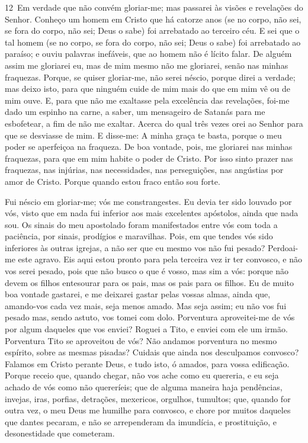 \medskip

\lettrine{12}\ Em verdade que não convém gloriar-me; mas
passarei às visões e revelações do Senhor. Conheço um homem em
Cristo que há catorze anos (se no corpo, não sei, se fora do corpo,
não sei; Deus o sabe) foi arrebatado ao terceiro céu. E sei que
o tal homem (se no corpo, se fora do corpo, não sei; Deus o sabe)
foi arrebatado ao paraíso; e ouviu palavras inefáveis, que ao
homem não é lícito falar. De alguém assim me gloriarei eu, mas
de mim mesmo não me gloriarei, senão nas minhas fraquezas.
Porque, se quiser gloriar-me, não serei néscio, porque direi a
verdade; mas deixo isto, para que ninguém cuide de mim mais do que
em mim vê ou de mim ouve. E, para que não me exaltasse pela
excelência das revelações, foi-me dado um espinho na carne, a saber,
um mensageiro de Satanás para me esbofetear, a fim de não me
exaltar. Acerca do qual três vezes orei ao Senhor para que se
desviasse de mim. E disse-me: A minha graça te basta, porque o
meu poder se aperfeiçoa na fraqueza. De boa vontade, pois, me
gloriarei nas minhas fraquezas, para que em mim habite o poder de
Cristo. Por isso sinto prazer nas fraquezas, nas injúrias,
nas necessidades, nas perseguições, nas angústias por amor de
Cristo. Porque quando estou fraco então sou forte.

Fui néscio em gloriar-me; vós me constrangestes. Eu devia ter
sido louvado por vós, visto que em nada fui inferior aos mais
excelentes apóstolos, ainda que nada sou. Os sinais do meu
apostolado foram manifestados entre vós com toda a paciência, por
sinais, prodígios e maravilhas. Pois, em que tendes vós sido
inferiores às outras igrejas, a não ser que eu mesmo vos não fui
pesado? Perdoai-me este agravo. Eis aqui estou pronto para
pela terceira vez ir ter convosco, e não vos serei pesado, pois que
não busco o que é vosso, mas sim a vós: porque não devem os filhos
entesourar para os pais, mas os pais para os filhos. Eu de
muito boa vontade gastarei, e me deixarei gastar pelas vossas almas,
ainda que, amando-vos cada vez mais, seja menos amado. Mas
seja assim; eu não vos fui pesado mas, sendo astuto, vos tomei com
dolo. Porventura aproveitei-me de vós por algum daqueles que
vos enviei? Roguei a Tito, e enviei com ele um irmão.
Porventura Tito se aproveitou de vós? Não andamos porventura no
mesmo espírito, sobre as mesmas pisadas? Cuidais que ainda
nos desculpamos convosco? Falamos em Cristo perante Deus, e tudo
isto, ó amados, para vossa edificação. Porque receio que,
quando chegar, não vos ache como eu quereria, e eu seja achado de
vós como não quereríeis; que de alguma maneira haja pendências,
invejas, iras, porfias, detrações, mexericos, orgulhos, tumultos;
que, quando for outra vez, o meu Deus me humilhe para
convosco, e chore por muitos daqueles que dantes pecaram, e não se
arrependeram da imundícia, e prostituição, e desonestidade que
cometeram.


